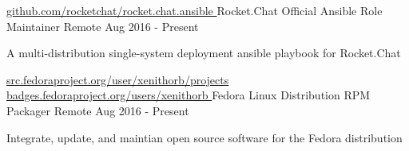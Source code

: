 \begin{cventries}
	\cventry
	{ 
		\href{https://github.com/rocketchat/rocket.chat.ansible}{ github.com/rocketchat/rocket.chat.ansible }
	}
	{Rocket.Chat Official Ansible Role Maintainer}
	{Remote}
	{Aug 2016 - Present}
	{\begin{cvitems}
		\item {A multi-distribution single-system deployment ansible playbook for Rocket.Chat}
		\end{cvitems}}
	\cventry
	{
		\href{https://src.fedoraproject.org/user/xenithorb/projects}{ src.fedoraproject.org/user/xenithorb/projects }
		\href{https://badges.fedoraproject.org/user/xenithorb}{ badges.fedoraproject.org/users/xenithorb }
	}
	{Fedora Linux Distribution RPM Packager}
	{Remote}
	{Aug 2016 - Present}
	{\begin{cvitems}
		\item {Integrate, update, and maintian open source software for the Fedora distribution}
		\end{cvitems}}
\end{cventries}